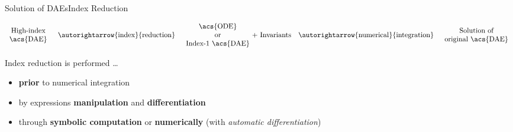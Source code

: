 \begin{frame}{Solution of \aclp{DAE}}{Index Reduction}
  \begin{bbox}
    \vspace{-1.0em}
    \begin{equation*}
      \begin{array}{c}
        \text{High-index} \\
        \text{\acs{DAE}}
      \end{array}
      \quad \autorightarrow{\text{index}}{\text{reduction}} \quad
      \begin{array}{c}
        \text{\acs{ODE}} \\
        \text{or} \\
        \text{Index-1 \acs{DAE}} \\
      \end{array} {\!+~\text{Invariants}}
      \quad \autorightarrow{\text{numerical}}{\text{integration}} \quad
      \begin{array}{c}
        \text{Solution of} \\
        \text{original \acs{DAE}}
      \end{array}
    \end{equation*}
  \end{bbox}
  \vspace{1.0em}
  Index reduction is performed \dots
  \begin{itemize}
    \item \textbf{prior} to numerical integration
    \item by expressions \textbf{manipulation} and \textbf{differentiation}
    \item through \textbf{symbolic computation} or \textbf{numerically} (with \emph{automatic differentiation})
  \end{itemize}
  \vspace{0.5em}
\end{frame}

